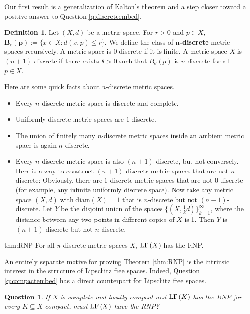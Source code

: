 \documentclass[12pt]{amsart}
\newtheorem{question}[theorem]{Question}
\theoremstyle{definition}
\newtheorem{definition}[theorem]{Definition}
\numberwithin{equation}{section}
\def \sbs {\subseteq}
\newcommand{\diam}[1]{\mathrm{diam}\left( #1 \right)}
\begin{document}
Our first result is a generalization of Kalton's theorem and a step closer toward a positive answer to Question \ref{q:discreteembed}.

\begin{definition}
Let $(X,d)$ be a metric space. For $r > 0$ and $p \in X$, $\boldsymbol{B_r(p)} := \{x \in X: d(x,p) \leq r\}$. We define the class of $\boldsymbol{n}$\textbf{-discrete} metric spaces recursively. A metric space is $0$-discrete if it is finite. A metric space $X$ is $(n+1)$-discrete if there exists $\theta > 0$ such that $B_\theta(p)$ is $n$-discrete for all $p \in X$. 
\end{definition}

Here are some quick facts about $n$-discrete metric spaces.
\begin{itemize}
\item Every $n$-discrete metric space is discrete and complete.
\item Uniformly discrete metric spaces are $1$-discrete.
\item The union of finitely many $n$-discrete metric spaces inside an ambient metric space is again $n$-discrete.
\item Every $n$-discrete metric space is also $(n+1)$-discrete, but not conversely. Here is a way to construct $(n+1)$-discrete metric spaces that are not $n$-discrete: Obviously, there are $1$-discrete metric spaces that are not $0$-discrete (for example, any infinite uniformly discrete space). Now take any metric space $(X,d)$ with $\diam{X} = 1$ that is $n$-discrete but not $(n-1)$-discrete. Let $Y$ be the disjoint union of the spaces $\{(X,\frac{1}{k}d)\}_{k=1}^\infty$, where the distance between any two points in different copies of $X$ is 1. Then $Y$ is $(n+1)$-discrete but not $n$-discrete.
\end{itemize}

\begin{reptheorem}{thm:RNP}
For all $n$-discrete metric spaces $X$, $\LF{X}$ has the RNP.
\end{reptheorem}

An entirely separate motive for proving Theorem \ref{thm:RNP} is the intrinsic interest in the structure of Lipschitz free spaces. Indeed, Question \ref{q:compactembed} has a direct counterpart for Lipschitz free spaces.

\begin{question}
If $X$ is complete and locally compact and $\LF{K}$ has the RNP for every $K \sbs X$ compact, must $\LF{X}$ have the RNP?
\end{question}
\end{document}
